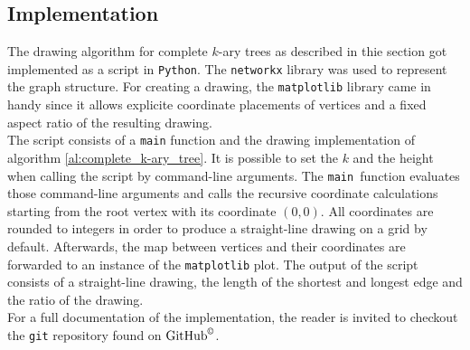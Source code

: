\subsection{Implementation}

The drawing algorithm for complete $k$-ary trees as described in thie section got implemented as a script in \texttt{Python}. The \texttt{networkx} library was used to represent the graph structure. For creating a drawing, the \texttt{matplotlib} library came in handy since it allows explicite coordinate placements of vertices and a fixed aspect ratio of the resulting drawing.\\
The script consists of a \texttt{main} function and the drawing implementation of algorithm \ref{al:complete_k-ary_tree}. It is possible to set the $k$ and the height when calling the script by command-line arguments. The \texttt{main }function evaluates those command-line arguments and calls the recursive coordinate calculations starting from the root vertex with its coordinate $(0,0)$. All coordinates are rounded to integers in order to produce a straight-line drawing on a grid by default. Afterwards, the map between vertices and their coordinates are forwarded to an instance of the \texttt{matplotlib} plot. The output of the script consists of a straight-line drawing, the length of the shortest and longest edge and the ratio of the drawing.
\bigskip\\
For a full documentation of the implementation, the reader is invited to checkout the \texttt{git} repository found on $\text{GitHub}^{\copyright}$\cite{repository}.

